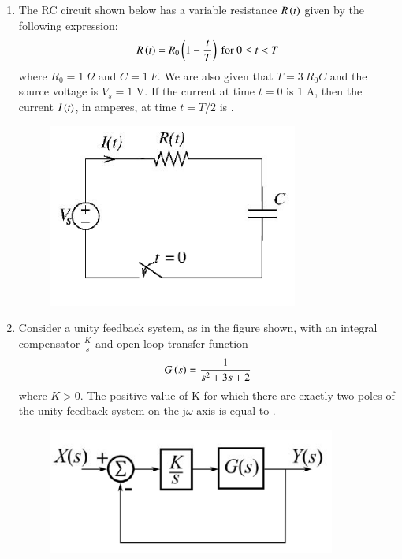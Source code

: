 \documentclass[a4paper, 11pt]{article}
\begin{document}
\begin{enumerate}
    \begin{enumerate}
    \end{enumerate}
    
    \hfill{}

    \item The RC circuit shown below has a variable resistance $R\left(t\right)$ given by the following expression:
    \[
    R\left(t\right)=R_{0}\left(1-\frac{t}{T}\right) \text{ for } 0\le t<T
    \]
    where $R_{0}=1~\Omega$ and $C=1~F$. We are also given that $T=3~R_{0}C$ and the source voltage is $V_{s}=1$ V. If the current at time $t=0$ is 1 A, then the current $I\left(t\right)$, in amperes, at time $t=T/2$ is \underline{\hspace{2cm}} .
    
    \begin{figure}[H]
        \centering
        \includegraphics[width=0.4\columnwidth]{figs/q41.png}
        \caption*{}
        \label{fig:q41}
    \end{figure}

    \hfill{}
    
    \item Consider a unity feedback system, as in the figure shown, with an integral compensator $\frac{K}{s}$ and open-loop transfer function
    \[
    G\left(s\right)=\frac{1}{s^{2}+3s+2}
    \]
    where $K>0$. The positive value of K for which there are exactly two poles of the unity feedback system on the j$\omega$ axis is equal to \underline{\hspace{2cm}} .
    
    \begin{figure}[H]
        \centering
        \includegraphics[width=0.6\columnwidth]{figs/q42.png}
        \caption*{}
        \label{fig:q42}
    \end{figure}
    

\end{enumerate}
\end{document}
